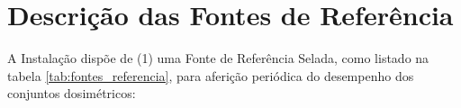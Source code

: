\chapter{Descrição das Fontes de Referência}
\label{ch:descricao_fonte-referencia}
A Instalação dispõe de (1) uma Fonte de Referência Selada, como listado na tabela \ref{tab:fontes_referencia}, para aferição periódica do desempenho dos conjuntos dosimétricos:

\begin{table}[!ht]
    \centering
    \caption{Fonte de Referência.}
    \label{tab:fontes_referencia}
\end{table}

\vfill